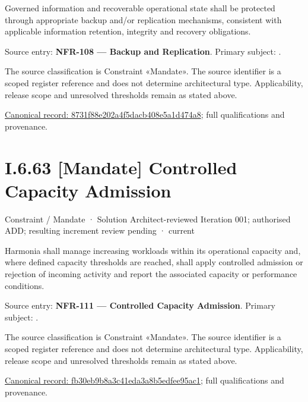 Governed information and recoverable operational state shall be protected through appropriate backup and/or replication mechanisms, consistent with applicable information retention, integrity and recovery obligations.



Source entry: \textbf{NFR-108 — Backup and Replication}. Primary subject: \texttt{}.



The source classification is Constraint «Mandate». The source identifier is a scoped register reference and does not determine architectural type. Applicability, release scope and unresolved thresholds remain as stated above.


{\footnotesize \href{../../../../../../../continuum/motivation/constraint/mandate/8731f88e202a4f5dacb408e5a1d474a8.md}{Canonical record: 8731f88e202a4f5dacb408e5a1d474a8}; full qualifications and provenance.}\par
\section*{I.6.63 [Mandate] Controlled Capacity Admission}
\label{navigation:I.6.63}

\label{element:fb30eb9b8a3c41eda3a8b5edfee95ac1}
{\small Constraint / Mandate · Solution Architect-reviewed Iteration 001; authorised ADD; resulting increment review pending · current}\par

Harmonia shall manage increasing workloads within its operational capacity and, where defined capacity thresholds are reached, shall apply controlled admission or rejection of incoming activity and report the associated capacity or performance conditions.



Source entry: \textbf{NFR-111 — Controlled Capacity Admission}. Primary subject: \texttt{}.



The source classification is Constraint «Mandate». The source identifier is a scoped register reference and does not determine architectural type. Applicability, release scope and unresolved thresholds remain as stated above.


{\footnotesize \href{../../../../../../../continuum/motivation/constraint/mandate/fb30eb9b8a3c41eda3a8b5edfee95ac1.md}{Canonical record: fb30eb9b8a3c41eda3a8b5edfee95ac1}; full qualifications and provenance.}\par

